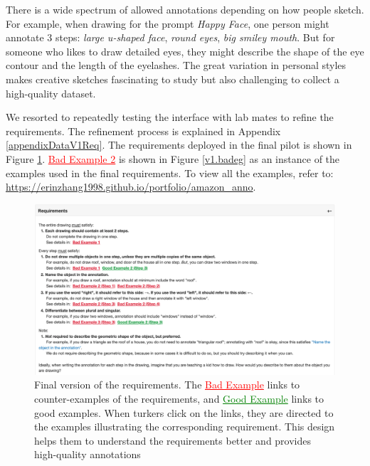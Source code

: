 There is a wide spectrum of allowed annotations depending on how people sketch. For example, when drawing for the prompt \textit{Happy Face}, one person might annotate 3 steps: \textit{large u-shaped face}, \textit{round eyes}, \textit{big smiley mouth}. But for someone who likes to draw detailed eyes, they might describe the shape of the eye contour and the length of the eyelashes. 
The great variation in personal styles makes creative sketches fascinating to study but also challenging to collect a high-quality dataset. 

We resorted to repeatedly testing the interface with lab mates to refine the requirements. The refinement process is explained in Appendix \ref{appendixDataV1Req}. 
The requirements deployed in the final pilot is shown in Figure \ref{v1.requirement}.
\textcolor{red}{\underline{Bad Example 2}} is shown in Figure \ref{v1.badeg} as an instance of the examples used in the final requirements. To view all the examples, refer to: \url{https://erinzhang1998.github.io/portfolio/amazon_anno}. 


\begin{figure}[!htb]
\includegraphics[width=\linewidth]{data_collection/v1_requirement.png}  
\caption{Final version of the requirements. The \textcolor{red}{\underline{Bad Example}} links to counter-examples of the requirements, and \textcolor{green}{\underline{Good Example}} links to good examples. When turkers click on the links, they are directed to the examples illustrating the corresponding requirement. This design helps them to understand the requirements better and provides high-quality annotations}
\label{v1.requirement}
\end{figure}

